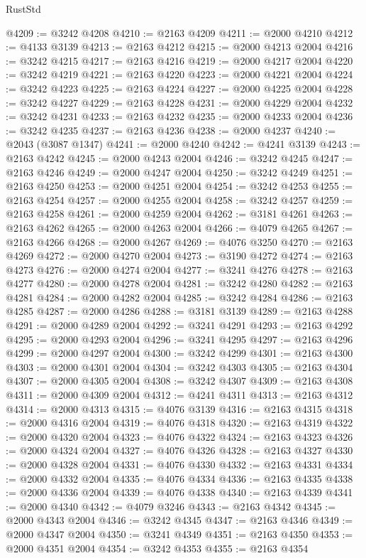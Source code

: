 \begin{lexlean}{RustStd}
\begin{coremodule}
@4209 := @3242 @4208
@4210 := @2163 @4209
@4211 := @2000 @4210
@4212 := @4133 @3139
@4213 := @2163 @4212
@4215 := @2000 @4213 @2004
@4216 := @3242 @4215
@4217 := @2163 @4216
@4219 := @2000 @4217 @2004
@4220 := @3242 @4219
@4221 := @2163 @4220
@4223 := @2000 @4221 @2004
@4224 := @3242 @4223
@4225 := @2163 @4224
@4227 := @2000 @4225 @2004
@4228 := @3242 @4227
@4229 := @2163 @4228
@4231 := @2000 @4229 @2004
@4232 := @3242 @4231
@4233 := @2163 @4232
@4235 := @2000 @4233 @2004
@4236 := @3242 @4235
@4237 := @2163 @4236
@4238 := @2000 @4237
@4240 := @2043 (@3087 @1347)
@4241 := @2000 @4240
@4242 := @4241 @3139
@4243 := @2163 @4242
@4245 := @2000 @4243 @2004
@4246 := @3242 @4245
@4247 := @2163 @4246
@4249 := @2000 @4247 @2004
@4250 := @3242 @4249
@4251 := @2163 @4250
@4253 := @2000 @4251 @2004
@4254 := @3242 @4253
@4255 := @2163 @4254
@4257 := @2000 @4255 @2004
@4258 := @3242 @4257
@4259 := @2163 @4258
@4261 := @2000 @4259 @2004
@4262 := @3181 @4261
@4263 := @2163 @4262
@4265 := @2000 @4263 @2004
@4266 := @4079 @4265
@4267 := @2163 @4266
@4268 := @2000 @4267
@4269 := @4076 @3250
@4270 := @2163 @4269
@4272 := @2000 @4270 @2004
@4273 := @3190 @4272
@4274 := @2163 @4273
@4276 := @2000 @4274 @2004
@4277 := @3241 @4276
@4278 := @2163 @4277
@4280 := @2000 @4278 @2004
@4281 := @3242 @4280
@4282 := @2163 @4281
@4284 := @2000 @4282 @2004
@4285 := @3242 @4284
@4286 := @2163 @4285
@4287 := @2000 @4286
@4288 := @3181 @3139
@4289 := @2163 @4288
@4291 := @2000 @4289 @2004
@4292 := @3241 @4291
@4293 := @2163 @4292
@4295 := @2000 @4293 @2004
@4296 := @3241 @4295
@4297 := @2163 @4296
@4299 := @2000 @4297 @2004
@4300 := @3242 @4299
@4301 := @2163 @4300
@4303 := @2000 @4301 @2004
@4304 := @3242 @4303
@4305 := @2163 @4304
@4307 := @2000 @4305 @2004
@4308 := @3242 @4307
@4309 := @2163 @4308
@4311 := @2000 @4309 @2004
@4312 := @4241 @4311
@4313 := @2163 @4312
@4314 := @2000 @4313
@4315 := @4076 @3139
@4316 := @2163 @4315
@4318 := @2000 @4316 @2004
@4319 := @4076 @4318
@4320 := @2163 @4319
@4322 := @2000 @4320 @2004
@4323 := @4076 @4322
@4324 := @2163 @4323
@4326 := @2000 @4324 @2004
@4327 := @4076 @4326
@4328 := @2163 @4327
@4330 := @2000 @4328 @2004
@4331 := @4076 @4330
@4332 := @2163 @4331
@4334 := @2000 @4332 @2004
@4335 := @4076 @4334
@4336 := @2163 @4335
@4338 := @2000 @4336 @2004
@4339 := @4076 @4338
@4340 := @2163 @4339
@4341 := @2000 @4340
@4342 := @4079 @3246
@4343 := @2163 @4342
@4345 := @2000 @4343 @2004
@4346 := @3242 @4345
@4347 := @2163 @4346
@4349 := @2000 @4347 @2004
@4350 := @3241 @4349
@4351 := @2163 @4350
@4353 := @2000 @4351 @2004
@4354 := @3242 @4353
@4355 := @2163 @4354

\end{coremodule}
\end{lexlean}
